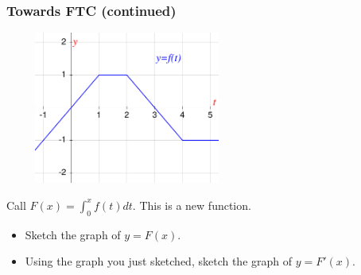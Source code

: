 \documentclass[14pt]{beamer}
\newcommand {\DS} [1] {${\displaystyle #1}$}
\newcommand{\setsize}[1]{\fontsize{#1}{#1}\selectfont} %
\newcommand{\smallerfont}{\setsize{13}} %
\begin{document}
\begin{frame}[t]
\smallerfont
\frametitle{Towards FTC (continued)}

\begin{center}
	\includegraphics[width=8cm, height=5cm]{G21}
\end{center}

Call \DS{F(x) = \int_0^x f(t) dt}.  This is a new function. 
\begin{itemize}
	\item Sketch the graph of \DS{y=F(x)}.  
	\item  Using the graph you just sketched, sketch the graph of \DS{y=F'(x)}.
\end{itemize}
\end{frame}
\end{document}
